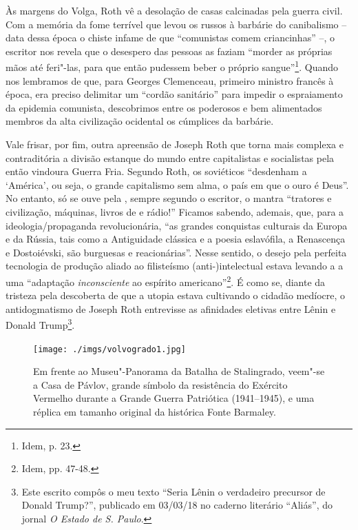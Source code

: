 Às margens do Volga, Roth vê a desolação de casas calcinadas pela guerra
civil. Com a memória da fome terrível que levou os russos à barbárie do
canibalismo -- data dessa época o chiste infame de que ``comunistas
comem criancinhas'' --, o escritor nos revela que o desespero das
pessoas as faziam ``morder as próprias mãos até feri"-las, para que então
pudessem beber o próprio sangue''\footnote{Idem, p. 23.}. Quando nos
lembramos de que, para Georges Clemenceau, primeiro ministro francês à
época, era preciso delimitar um ``cordão sanitário'' para impedir o
espraiamento da epidemia comunista, descobrimos entre os poderosos e bem
alimentados membros da alta civilização ocidental os cúmplices da
barbárie.

Vale frisar, por fim, outra apreensão de Joseph Roth que torna mais
complexa e contraditória a divisão estanque do mundo entre capitalistas
e socialistas pela então vindoura Guerra Fria. Segundo Roth, os
soviéticos ``desdenham a `América', ou seja, o grande capitalismo sem
alma, o país em que o ouro é Deus''. No entanto, só se ouve pela ,
sempre segundo o escritor, o mantra ``tratores e civilização, máquinas,
livros de  e rádio!'' Ficamos sabendo, ademais, que, para a
ideologia/propaganda revolucionária, ``as grandes conquistas culturais
da Europa e da Rússia, tais como a Antiguidade clássica e a poesia
eslavófila, a Renascença e Dostoiévski, são burguesas e reacionárias''.
Nesse sentido, o desejo pela perfeita tecnologia de produção aliado ao
filisteísmo (anti-)intelectual estava levando a  a uma ``adaptação
\emph{inconsciente} ao espírito americano''\footnote{Idem, pp. 47-48.}.
É como se, diante da tristeza pela descoberta de que a utopia estava
cultivando o cidadão medíocre, o antidogmatismo de Joseph Roth
entrevisse as afinidades eletivas entre Lênin e Donald Trump\footnote{Este
  escrito compôs o meu texto ``Seria Lênin o verdadeiro precursor de
  Donald Trump?'', publicado em 03/03/18 no caderno literário ``Aliás'',
  do jornal \emph{O Estado de S. Paulo}.}.


\pagebreak
\clearpage
\thispagestyle{empty}

\movetoevenpage
\begin{absolutelynopagebreak}
\begin{vplace}
\begin{figure}[H]
\begin{adjustwidth}{-2.7cm}{}
  \vspace{2.7cm}
  \hspace{0.5cm}
  \texttt{[image: ./imgs/volvogrado1.jpg]}  
\end{adjustwidth}
  \caption{Em frente ao Museu"-Panorama da Batalha de Stalingrado, veem"-se a Casa de Pávlov, grande símbolo da resistência do Exército Vermelho durante a Grande Guerra Patriótica (1941--1945), e uma réplica em tamanho original da histórica Fonte Barmaley.}

\thispagestyle{empty}

\end{figure}
\end{vplace}

\end{absolutelynopagebreak}


